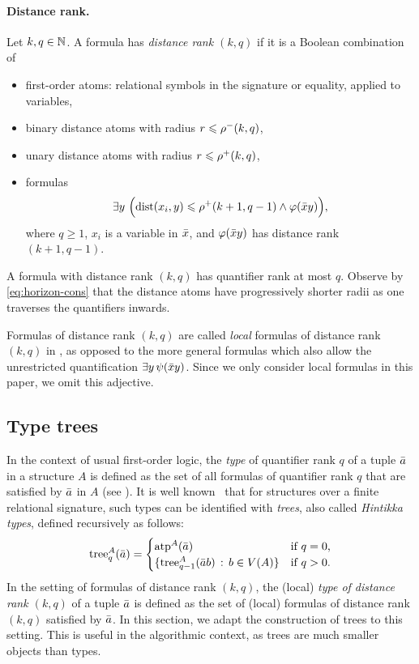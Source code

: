 \paragraph{Distance rank.}
Let $k,q\in\mathbb N$.
A \distFO formula has \emph{distance rank \((k,q)\)} if it is a Boolean combination of
\begin{itemize}
\item first-order atoms: relational symbols in the signature or equality, applied to variables,
\item binary distance atoms with radius $r\leqslant\rho^-(k,q)$,
\item unary distance atoms with radius $r\leqslant\rho^+(k,q)$,
\item
formulas
\[
\exists y~\Bigl(\mathrm{dist}(x_i,y)\leqslant \rho^+(k+1,q-1)\land\varphi(\bar x y)\Bigr),
\]
where \(q \ge 1\), $x_i$ is a variable in $\bar x$, and $\varphi(\bar x y)$ has distance rank $(k+1,q-1)$.
\end{itemize}

A formula with distance rank \((k,q)\) has quantifier rank at most \(q\).
Observe by \eqref{eq:horizon-cons} that
the distance atoms have progressively shorter radii as one traverses the quantifiers
inwards. 

Formulas of distance rank $(k,q)$ are called \emph{local} formulas of distance rank $(k,q)$ in 
\cite{mw-arxiv,locality-note}, as opposed to the more general formulas which also allow the unrestricted quantification $\exists y\, \psi(\bar x y)$. Since we only consider local formulas in this paper, we omit this adjective.


\subsection{Type trees}
\label{sec:typetrees}
 In the context of usual first-order logic, the \emph{type} of quantifier rank $q$ of a tuple $\bar a$ in a structure $A$ is defined as the set of all formulas of quantifier rank $q$ that are satisfied by $\bar a$ in $A$ (see ). It is well known~\cite{Scott1979}
  that for structures over a finite relational signature, such types can be identified with \emph{trees}, also called \emph{Hintikka types},
defined recursively as follows:
$$\mathrm{tree}_q^A(\bar a)=\begin{cases}
\textnormal{atp}^A(\bar a)&\text{if $q=0$,}\\
\{\mathrm{tree}_{q-1}^A(\bar a b) \,:\, b\in V(A) \}&\text{if $q>0$}.
\end{cases}$$
In the setting of \distFO formulas of distance rank $(k,q)$, the (local) \emph{type of distance rank $(k,q)$} of a tuple $\bar a$
is defined  \cite{mw-arxiv} as the set of (local) \distFO formulas of distance rank $(k,q)$ satisfied by $\bar a$.
In this section, we adapt the construction of trees to this setting. This is useful in the algorithmic context, as trees are much smaller objects than types.



